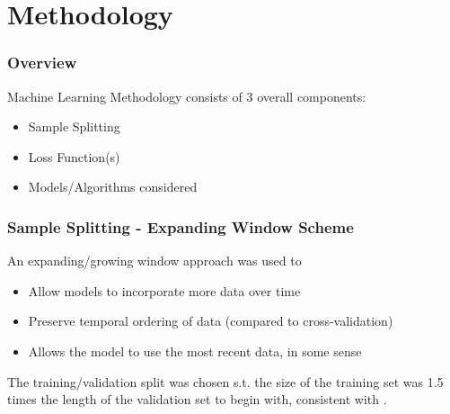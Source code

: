\documentclass[aspectratio=169]{beamer}
\begin{document}
\section{Methodology}

\begin{frame}
\frametitle{Overview}
Machine Learning Methodology consists of 3 overall components:
\begin{itemize}
	\item Sample Splitting
	\item Loss Function(s)
	\item Models/Algorithms considered
\end{itemize}
\end{frame}


\begin{frame}
\frametitle{Sample Splitting - Expanding Window Scheme}
An expanding/growing window approach was used to
\begin{itemize}
	\item Allow models to incorporate more data over time
	\item Preserve temporal ordering of data (compared to cross-validation)
	\item Allows the model to use the most recent data, in some sense
\end{itemize}
The training/validation split was chosen s.t. the size of the training set was 1.5 times the length of the validation set to begin with, consistent with \cite{gu_empirical_2018}.
\end{frame}
\end{document}

